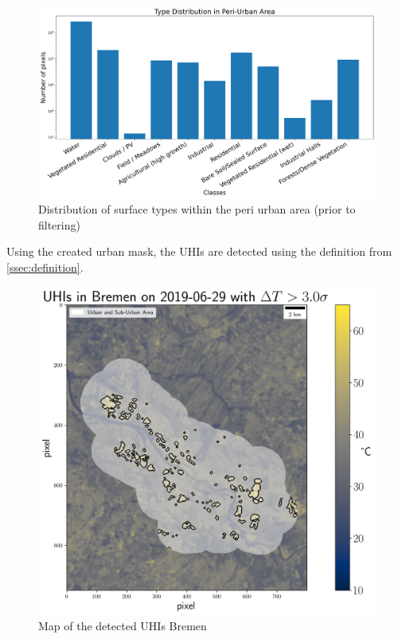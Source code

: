 \documentclass[12pt,a4paper, english,twoside]{scrartcl}
\begin{document}
        \begin{figure}[!htbp]
         \centering
         \includegraphics[width=\textwidth]{img/ClassDistributionPU.png}
         \caption{Distribution of surface types within the peri urban area (prior to filtering)}\label{fig:classesPeri}
        \end{figure}
        Using the created urban mask, the UHIs are detected using the definition from \cref{ssec:definition}.
       \begin{figure}[!hbtp]
          \includegraphics[width=\textwidth]{img/UHIs_Bremen_2019-06-29_s:3}
         \caption{Map of the detected UHIs Bremen}\label{fig:uhisHB2019}
       \end{figure}
\end{document}
